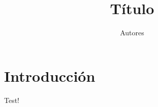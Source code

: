 \documentclass{article}
\title{Título}
\author{Autores}
\begin{document}
\maketitle
\section{Introducción}
Test!
\end{document}
